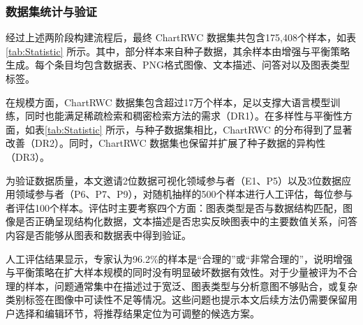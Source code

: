 \subsubsection{数据集统计与验证}

经过上述两阶段构建流程后，最终 ChartRWC 数据集共包含175,408个样本，如表\ref{tab:Statistic} 所示。其中，部分样本来自种子数据，其余样本由增强与平衡策略生成。每个条目均包含数据表、PNG格式图像、文本描述、问答对以及图表类型标签。

在规模方面，ChartRWC 数据集包含超过17万个样本，足以支撑大语言模型训练，同时也能满足稀疏检索和稠密检索方法的需求（DR1）。在多样性与平衡性方面，如表\ref{tab:Statistic} 所示，与种子数据集相比，ChartRWC 的分布得到了显著改善（DR2）。同时，ChartRWC 数据集也保留并扩展了种子数据的异构性（DR3）。

为验证数据质量，本文邀请2位数据可视化领域参与者（E1、P5）以及3位数据应用领域参与者（P6、P7、P9），对随机抽样的500个样本进行人工评估，每位参与者评估100个样本。评估时主要考察四个方面：图表类型是否与数据结构匹配，图像是否正确呈现结构化数据，文本描述是否忠实反映图表中的主要数值关系，问答内容是否能够从图表和数据表中得到验证。

人工评估结果显示，专家认为96.2\%的样本是“合理的”或“非常合理的”，说明增强与平衡策略在扩大样本规模的同时没有明显破坏数据有效性。对于少量被评为不合理的样本，问题通常集中在描述过于宽泛、图表类型与分析意图不够贴合，或复杂类别标签在图像中可读性不足等情况。这些问题也提示本文后续方法仍需要保留用户选择和编辑环节，将推荐结果定位为可调整的候选方案。

\newpage

